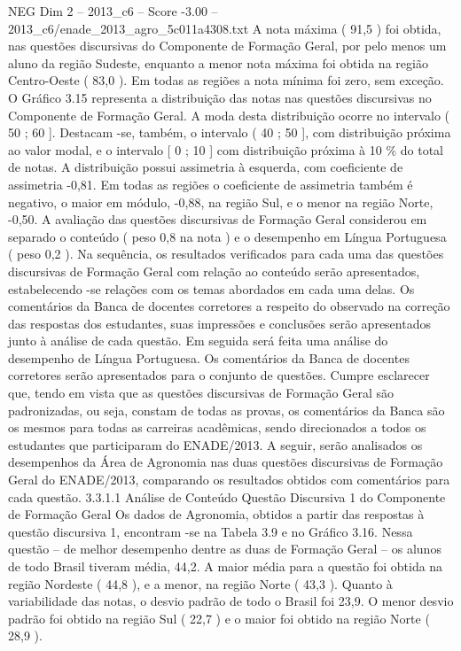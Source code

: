 \begin{textsample}{NEG Dim 2 – 2013\_c6 – Score -3.00 – 2013\_c6/enade\_2013\_agro\_5c011a4308.txt}
A nota máxima ( 91,5 ) foi obtida, nas questões discursivas do Componente de Formação Geral, por pelo menos um aluno da região Sudeste, enquanto a menor nota máxima foi obtida na região Centro-Oeste ( 83,0 ).
Em todas as regiões a nota mínima foi zero, sem exceção.
O Gráfico 3.15 representa a distribuição das notas nas questões discursivas no Componente de Formação Geral.
A moda desta distribuição ocorre no intervalo ( 50 ; 60 ].
Destacam -se, também, o intervalo ( 40 ; 50 ], com distribuição próxima ao valor modal, e o intervalo [ 0 ; 10 ] com distribuição próxima à 10 \% do total de notas.
A distribuição possui assimetria à esquerda, com coeficiente de assimetria -0,81.
Em todas as regiões o coeficiente de assimetria também é negativo, o maior em módulo, -0,88, na região Sul, e o menor na região Norte, -0,50.
A avaliação das questões discursivas de Formação Geral considerou em separado o conteúdo ( peso 0,8 na nota ) e o desempenho em Língua Portuguesa ( peso 0,2 ).
Na sequência, os resultados verificados para cada uma das questões discursivas de Formação Geral com relação ao conteúdo serão apresentados, estabelecendo -se relações com os temas abordados em cada uma delas.
Os comentários da Banca de docentes corretores a respeito do observado na correção das respostas dos estudantes, suas impressões e conclusões serão apresentados junto à análise de cada questão.
Em seguida será feita uma análise do desempenho de Língua Portuguesa.
Os comentários da Banca de docentes corretores serão apresentados para o conjunto de questões.
Cumpre esclarecer que, tendo em vista que as questões discursivas de Formação Geral são padronizadas, ou seja, constam de todas as provas, os comentários da Banca são os mesmos para todas as carreiras acadêmicas, sendo direcionados a todos os estudantes que participaram do ENADE/2013.
A seguir, serão analisados os desempenhos da Área de Agronomia nas duas questões discursivas de Formação Geral do ENADE/2013, comparando os resultados obtidos com comentários para cada questão. 3.3.1.1 Análise de Conteúdo Questão Discursiva 1 do Componente de Formação Geral Os dados de Agronomia, obtidos a partir das respostas à questão discursiva 1, encontram -se na Tabela 3.9 e no Gráfico 3.16.
Nessa questão – de melhor desempenho dentre as duas de Formação Geral – os alunos de todo Brasil tiveram média, 44,2.
A maior média para a questão foi obtida na região Nordeste ( 44,8 ), e a menor, na região Norte ( 43,3 ).
Quanto à variabilidade das notas, o desvio padrão de todo o Brasil foi 23,9.
O menor desvio padrão foi obtido na região Sul ( 22,7 ) e o maior foi obtido na região Norte ( 28,9 ).

\end{textsample}
